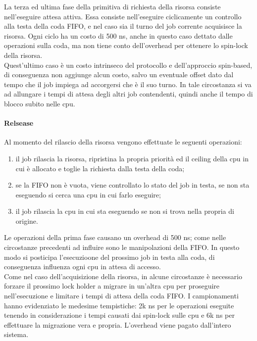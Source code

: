 \noindent La terza ed ultima fase della primitiva di richiesta della risorsa consiste nell'eseguire attesa attiva. Essa consiste nell'eseguire ciclicamente un controllo alla testa della coda FIFO, e nel caso sia il turno del job corrente acquisisce la risorsa. Ogni ciclo ha un costo di 500 ns, anche in questo caso dettato dalle operazioni sulla coda, ma non tiene conto dell'overhead per ottenere lo spin-lock della risorsa.\\

\noindent Quest'ultimo caso è un costo intrinseco del protocollo e dell'approccio spin-based, di conseguenza non aggiunge alcun costo, salvo un eventuale offset dato dal tempo che il job impiega ad accorgersi che è il suo turno. In tale circostanza si va ad allungare i tempi di attesa degli altri job contendenti, quindi anche il tempo di blocco subito nelle cpu.\\

\paragraph{Relsease} Al momento del rilascio della risorsa vengono effettuate le seguenti operazioni:

\begin{enumerate}
	\item il job rilascia la risorsa, ripristina la propria priorità ed il ceiling della cpu in cui è allocato e toglie la richiesta dalla testa della coda;
	\item se la FIFO non è vuota, viene controllato lo stato del job in testa, se non sta eseguendo si cerca una cpu in cui farlo eseguire;
	\item il job rilascia la cpu in cui sta eseguendo se non si trova nella propria di origine.
\end{enumerate}

\noindent Le operazioni della prima fase causano un overhead di 500 ns; come nelle circostanze precedenti ad influire sono le manipolazioni della FIFO. In questo modo si posticipa l'esecuzioone del prossimo job in testa alla coda, di conseguenza influenza ogni cpu in attesa di accesso.\\

\noindent Come nel caso dell'acquisizione della risorsa, in alcune circostanze è necessario forzare il prossimo lock holder a migrare in un'altra cpu per proseguire nell'esecuzione e limitare i tempi di attesa della coda FIFO. I campionamenti hanno evidenziato le medesime tempistiche: 2k ns per le operazioni eseguite tenendo in considerazione i tempi causati dai spin-lock sulle cpu e 6k ns per effettuare la migrazione vera e propria. L'overhead viene pagato dall'intero sistema.\\

